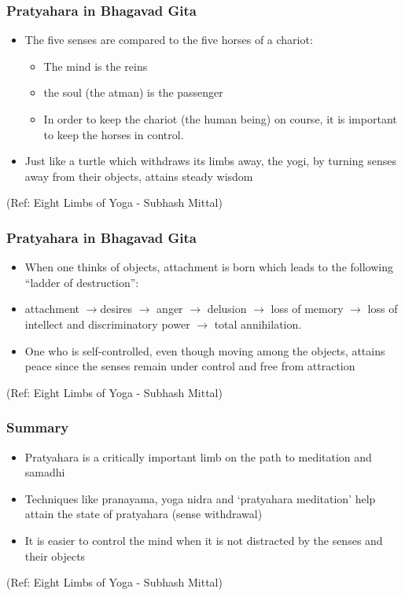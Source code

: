 \begin{frame}[fragile]\frametitle{Pratyahara in Bhagavad Gita}


	\begin{itemize}
	\item  The five senses are compared to the five horses of 
a chariot:
	\begin{itemize}

	\item   The mind is the reins 
	\item  the soul (the atman) is the passenger
	\item   In order to keep the chariot (the human being) on 
course, it is important to keep the horses in control. 
	\end{itemize}
	\item   Just like a turtle which withdraws its limbs away, 
the yogi, by turning senses away from their 
objects, attains steady wisdom
	\end{itemize}

\tiny{(Ref: Eight Limbs of Yoga - Subhash Mittal)}

\end{frame}

\begin{frame}[fragile]\frametitle{Pratyahara in Bhagavad Gita}


	\begin{itemize}
	\item  When one thinks of objects, attachment is 
born which leads to the following “ladder of 
destruction”: 
	\item   attachment $\rightarrow$desires $\rightarrow$ anger $\rightarrow$ delusion $\rightarrow$ loss 
of memory $\rightarrow$ loss of intellect and discriminatory 
power $\rightarrow$ total annihilation. 
	\item   One who is self-controlled, even though 
moving among the objects, attains peace 
since the senses remain under control and 
free from attraction
	\end{itemize}

\tiny{(Ref: Eight Limbs of Yoga - Subhash Mittal)}

\end{frame}

\begin{frame}[fragile]\frametitle{Summary}


	\begin{itemize}
	\item   Pratyahara is a critically important limb on the 
path to meditation and samadhi
	\item   Techniques like pranayama, yoga nidra and 
`pratyahara meditation' help attain the state 
of pratyahara (sense withdrawal)
	\item   It is easier to control the mind when it is not 
distracted by the senses and their objects
	\end{itemize}

\tiny{(Ref: Eight Limbs of Yoga - Subhash Mittal)}

\end{frame}
